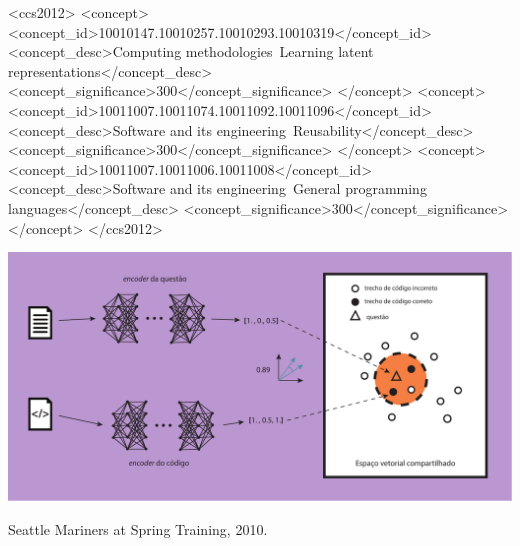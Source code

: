 \documentclass[sigconf]{acmart}
\begin{document}
\begin{CCSXML}
<ccs2012>
   <concept>
       <concept_id>10010147.10010257.10010293.10010319</concept_id>
       <concept_desc>Computing methodologies~Learning latent representations</concept_desc>
       <concept_significance>300</concept_significance>
       </concept>
   <concept>
       <concept_id>10011007.10011074.10011092.10011096</concept_id>
       <concept_desc>Software and its engineering~Reusability</concept_desc>
       <concept_significance>300</concept_significance>
       </concept>
   <concept>
       <concept_id>10011007.10011006.10011008</concept_id>
       <concept_desc>Software and its engineering~General programming languages</concept_desc>
       <concept_significance>300</concept_significance>
       </concept>
 </ccs2012>
\end{CCSXML}




\begin{teaserfigure}
  \includegraphics[width=\textwidth]{figuras/joint_embedding.pdf}
  \caption{Seattle Mariners at Spring Training, 2010.}
  \label{fig:teaser}
\end{teaserfigure}
\end{document}

